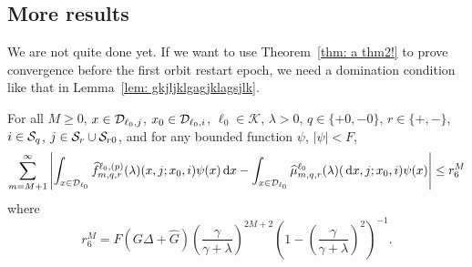 \subsection{More results} 
We are not quite done yet. If we want to use Theorem~\ref{thm: a thm2!} to prove convergence before the first orbit restart epoch, we need a domination condition like that in Lemma~\ref{lem: gkjljklgagjklagsjlk}. 
\begin{lem}\label{lem: gkjljklgagjklagsjlk2}For all \(M\geq 0\), \(x\in\mathcal{D}_{\ell_0,j}\), \(x_0\in\mathcal{D}_{\ell_0,i}\), \(\ell_0\in\mathcal K\), \(\lambda > 0\), \(q\in\{+0,-0\}\), \(r\in\{+,-\}\), \(i\in\mathcal{S}_q\), \(j\in\mathcal{S}_r\cup\mathcal{S}_{r0}\), and for any bounded function \(\psi\), \(|\psi|<F\), 
	\begin{align}
		\sum_{m=M+1}^\infty \left| \int_{x\in\mathcal{D}_{\ell_0}} \widehat f^{\ell_0,(p)}_{m,q,r}(\lambda)(x,j;x_0,i)\psi(x)\, \mathrm{d} x
		-
		\int_{x\in\mathcal{D}_{\ell_0}} \widehat \mu^{\ell_0}_{m,q,r}(\lambda)(\, \mathrm{d} x,j;x_0,i)\psi(x) \right| \leq  r_6^M
	\end{align} 
	where 
	\[ r_6^M =  F(G\Delta  + \widehat G )\left(\frac{\gamma}{\gamma+\lambda}\right)^{2M+2}\left(1-\left(\frac{\gamma}{\gamma+\lambda}\right)^2\right)^{-1}.\]
\end{lem}
